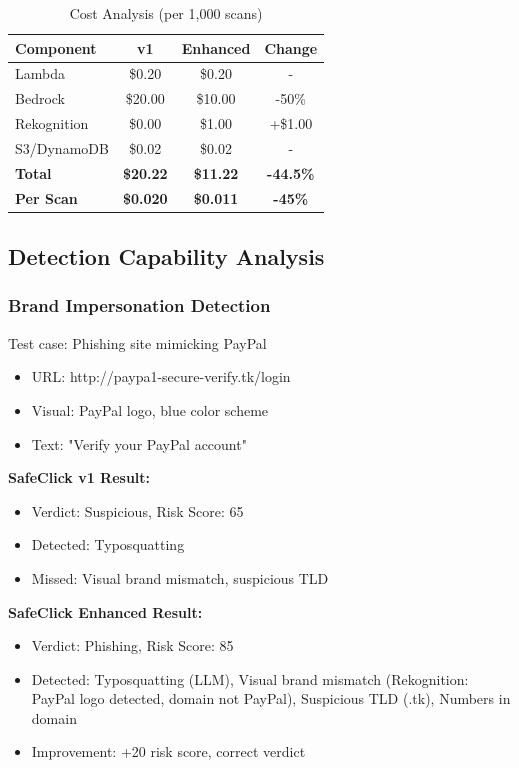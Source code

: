 \documentclass[conference]{IEEEtran}
\begin{document}
\begin{table}[htbp]
\caption{Cost Analysis (per 1,000 scans)}
\begin{center}
\begin{tabular}{|l|c|c|c|}
\hline
\textbf{Component} & \textbf{v1} & \textbf{Enhanced} & \textbf{Change} \\
\hline
Lambda & \$0.20 & \$0.20 & - \\
\hline
Bedrock & \$20.00 & \$10.00 & -50\% \\
\hline
Rekognition & \$0.00 & \$1.00 & +\$1.00 \\
\hline
S3/DynamoDB & \$0.02 & \$0.02 & - \\
\hline
\textbf{Total} & \textbf{\$20.22} & \textbf{\$11.22} & \textbf{-44.5\%} \\
\hline
\textbf{Per Scan} & \textbf{\$0.020} & \textbf{\$0.011} & \textbf{-45\%} \\
\hline
\end{tabular}
\end{center}
\end{table}


\subsection{Detection Capability Analysis}

\subsubsection{Brand Impersonation Detection}

Test case: Phishing site mimicking PayPal
\begin{itemize}
\item URL: http://paypa1-secure-verify.tk/login
\item Visual: PayPal logo, blue color scheme
\item Text: "Verify your PayPal account"
\end{itemize}

\textbf{SafeClick v1 Result:}
\begin{itemize}
\item Verdict: Suspicious, Risk Score: 65
\item Detected: Typosquatting
\item Missed: Visual brand mismatch, suspicious TLD
\end{itemize}

\textbf{SafeClick Enhanced Result:}
\begin{itemize}
\item Verdict: Phishing, Risk Score: 85
\item Detected: Typosquatting (LLM), Visual brand mismatch (Rekognition: PayPal logo detected, domain not PayPal), Suspicious TLD (.tk), Numbers in domain
\item Improvement: +20 risk score, correct verdict
\end{itemize}
\end{document}
